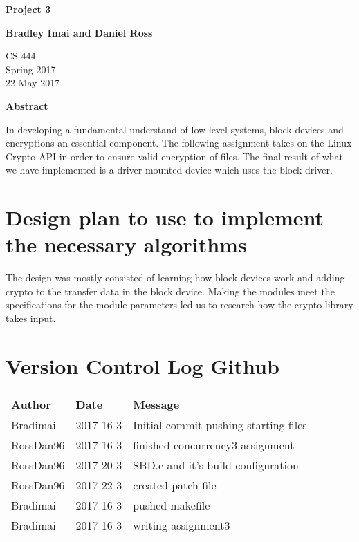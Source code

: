 \documentclass[letterpaper,10pt,titlepage]{article}
\begin{document}
\begin{titlepage}
    \begin{center}
        \vspace*{3.5cm}

        \textbf{Project 3}

        \vspace{0.5cm}

        \textbf{Bradley Imai and Daniel Ross}

        \vspace{0.8cm}

        CS 444\\
        Spring 2017\\
        22 May 2017\\

        \vspace{1cm}

        \textbf{Abstract}\\

        \vspace{0.5cm}

        In developing a fundamental understand of low-level systems, block devices and encryptions an essential component.  The following assignment takes on the Linux Crypto API in order to ensure valid encryption of files. The final result of what we have implemented is a driver mounted device which uses the block driver. \vfill


    \end{center}
\end{titlepage}

\newpage

\section{Design plan to use to implement the necessary algorithms}

The design was mostly consisted of learning how block devices work and adding crypto to the transfer data in the block device. Making the modules meet the specifications for the module parameters led us to research how the crypto library takes input.

\section{Version Control Log Github}
\begin{tabular}{lll} \textbf{Author}
     & \textbf{Date}
     & \textbf{Message}
\\ \hline
Bradimai & 2017-16-3 & Initial commit pushing starting files \\ \hline
RossDan96 & 2017-16-3 &  finished concurrency3 assignment\\ \hline
RossDan96 & 2017-20-3 &  SBD.c and it's build configuration\\ \hline
RossDan96 & 2017-22-3 &  created patch file\\ \hline
Bradimai & 2017-16-3 &  pushed makefile\\ \hline
Bradimai & 2017-16-3 &  writing assignment3\\ \hline
\end{tabular}
\end{document}
